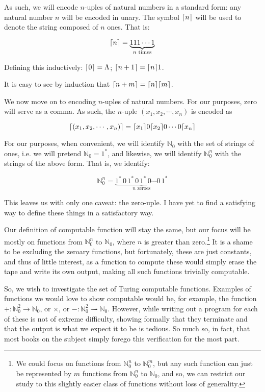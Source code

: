 \documentclass{article}
\newcommand{\N}{\mathbb{N}}
\DeclarePairedDelimiter{\ceil}{\lceil}{\rceil}
\begin{document}
	As such, we will encode $n$-uples of natural numbers in a standard form: any natural number $n$ will be encoded in unary. The symbol $\ceil{n}$ will be used to denote the string composed of $n$ ones. That is:
	
	\[\ceil{n} = \underbrace{111\cdots1}_{n \text{ times}}\]
	
	Defining this inductively: $\ceil{0} = \Lambda$; $\ceil{n+1} = \ceil{n}1$.
	
	It is easy to see by induction that $\ceil{n+m} = \ceil{n}\ceil{m}$.
	
	We now move on to encoding $n$-uples of natural numbers. For our purposes, zero will serve as a comma. As such, the $n$-uple $(x_1, x_2, \cdots, x_n)$ is encoded as

	\[ \ceil{(x_1, x_2, \cdots, x_n)} = \ceil{x_1}0\ceil{x_2}0\cdots0\ceil{x_n} \]
	
	For our purposes, when convenient, we will identify $\N_0$ with the set of strings of ones, i.e. we will pretend $\N_0 = 1^*$, and likewise, we will identify $\N_0^n$ with the strings of the above form. That is, we identify:
	
	\[\N_0^n = \underbrace{1^*\,0\,1^*\,0\,1^*\,0 \cdots 0\,1^*}_{n \text{ zeroes}}\]
	
	This leaves us with only one caveat: the zero-uple. I have yet to find a satisfying way to define these things in a satisfactory way.
	
	Our definition of computable function will stay the same, but our focus will be mostly on functions from $\N_0^n$ to $\N_0$, where $n$ is greater than zero.\footnote{We could focus on functions from $\N_0^n$ to $\N_0^m$, but any such function can just be represented by $m$ functions from $\N_0^n$ to $\N_0$, and so, we can restrict our study to this slightly easier class of functions without loss of generality.} It is a shame to be excluding the zeroary functions, but fortunately, these are just constants, and thus of little interest, as a function to compute these would simply erase the tape and write its own output, making all such functions trivially computable.
	
	So, we wish to investigate the set of Turing computable functions. Examples of functions we would love to show computable would be, for example, the function $+ : \N_0^2 \rightarrow \N_0$, or $\times$, or $- : \N_0^2 \rightharpoonup \N_0$. However, while writing out a program for each of these is not of extreme difficulty, showing formally that they terminate and that the output is what we expect it to be is tedious. So much so, in fact, that most books on the subject simply forego this verification for the most part.
	
\end{document}
